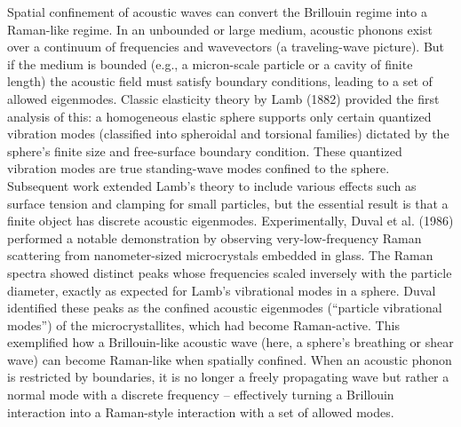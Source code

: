 Spatial confinement of acoustic waves can convert the Brillouin regime into a Raman-like regime. In an unbounded or large medium, acoustic phonons exist over a continuum of frequencies and wavevectors (a traveling-wave picture). But if the medium is bounded (e.g., a micron-scale particle or a cavity of finite length) the acoustic field must satisfy boundary conditions, leading to a set of allowed eigenmodes. Classic elasticity theory by Lamb (1882) \cite{lamb1881vibrations} provided the first analysis of this: a homogeneous elastic sphere supports only certain quantized vibration modes (classified into spheroidal and torsional families) dictated by the sphere’s finite size and free-surface boundary condition. These quantized vibration modes are true standing-wave modes confined to the sphere. Subsequent work extended Lamb’s theory to include various effects such as surface tension and clamping for small particles, \cite{} but the essential result is that a finite object has discrete acoustic eigenmodes. Experimentally, Duval et al. (1986) \cite{duval1986vibration} performed a notable demonstration by observing very-low-frequency Raman scattering from nanometer-sized microcrystals embedded in glass. The Raman spectra showed distinct peaks whose frequencies scaled inversely with the particle diameter, exactly as expected for Lamb’s vibrational modes in a sphere. Duval identified these peaks as the confined acoustic eigenmodes (“particle vibrational modes”) of the microcrystallites, which had become Raman-active. This exemplified how a Brillouin-like acoustic wave (here, a sphere’s breathing or shear wave) can become Raman-like when spatially confined. When an acoustic phonon is restricted by boundaries, it is no longer a freely propagating wave but rather a normal mode with a discrete frequency – effectively turning a Brillouin interaction into a Raman-style interaction with a set of allowed modes.


